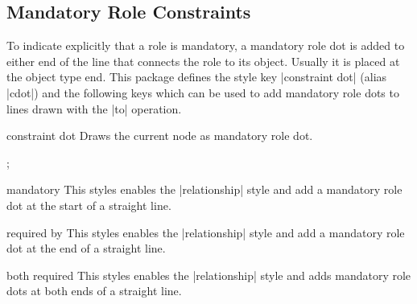 \documentclass[a4paper,10pt]{article}
\begin{document}
\subsection{Mandatory Role Constraints}
\label{sec:mandatoryconstraints}
To indicate explicitly that a role is mandatory, a mandatory role dot is added to either end of the line that connects the role to its object. Usually it is placed at the object type end. This package defines the style key |constraint dot| (alias |cdot|) and the following keys which can be used to add mandatory role dots to lines drawn with the |to| operation.

\begin{stylekey}{constraint dot}
Draws the current node as mandatory role dot.
\begin{codeexample}[]
\tikz \node[cdot] {};
\end{codeexample}
\end{stylekey}

\begin{stylekey}{mandatory}
This styles enables the |relationship| style and add a mandatory role dot at the start of a straight line.
\begin{codeexample}[]
\end{codeexample}
\end{stylekey}

\begin{stylekey}{required by}
This styles enables the |relationship| style and add a mandatory role dot at the end of a straight line.
\begin{codeexample}[]
\end{codeexample}
\end{stylekey}

\begin{stylekey}{both required}
This styles enables the |relationship| style and adds mandatory role dots at both ends of a straight line.
\begin{codeexample}[]
\end{codeexample}
\end{stylekey}
\end{document}
